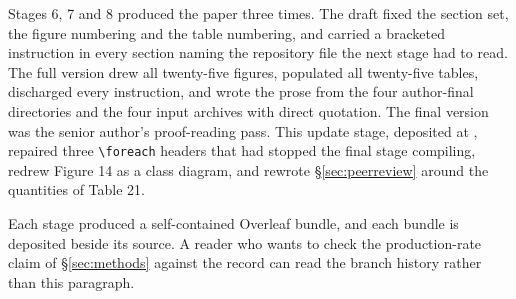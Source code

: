 Stages 6, 7 and 8 produced the paper three times. The draft fixed the section
set, the figure numbering and the table numbering, and carried a bracketed
instruction in every section naming the repository file the next stage had to
read. The full version drew all twenty-five figures, populated all twenty-five
tables, discharged every instruction, and wrote the prose from the four
author-final  directories and the four input archives with
direct quotation. The final version was the senior author's proof-reading pass.
This update stage, deposited at
, repaired three
\texttt{\textbackslash foreach} headers that had stopped the final stage
compiling, redrew Figure 14 as a class diagram, and rewrote
\S\ref{sec:peerreview} around the quantities of Table 21.

Each stage produced a self-contained Overleaf bundle, and each bundle is
deposited beside its source. A reader who wants to check the production-rate
claim of \S\ref{sec:methods} against the record can read the branch history
rather than this paragraph.
